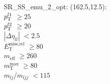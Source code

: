 SR\_SS\_emu\_2\_opt: (162.5,12.5): \\
$p_{\text{T}}^{l1}$ $\geq 25$ \\
$p_{\text{T}}^{l2}$ $\geq 20$ \\
$|\Delta\eta_{ll}|$ $<2.5$ \\
$E_{\text{T}}^{\text{miss,rel}}$ $\geq 80$ \\
$m_{\text{eff}}$ $\geq 260$ \\
$m_{\text{T}}^{\text{max}}$ $\geq 80$ \\
$m_{lj}$/$m_{ljj}$ $<115$ \\
